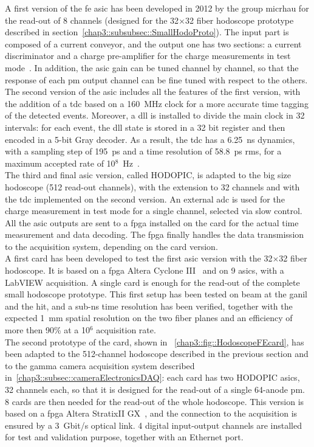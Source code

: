 A first version of the \gls{fe} \gls{asic} has been developed in 2012 by the group \gls{micrhau} for the read-out of 8 channels (designed for the 32$\times$32 fiber hodoscope prototype described in section~\ref{chap3::subsubsec::SmallHodoProto}). The input part is composed of a current conveyor, and the output one has two sections: a current discriminator and a charge pre-amplifier for the charge measurements in test mode~\parencite{Deng2012, Deng2013}. In addition, the \gls{asic} gain can be tuned channel by channel, so that the response of each \gls{pm} output channel can be fine tuned with respect to the others.\\
The second version of the \gls{asic} includes all the features of the first version, with the addition of a \gls{tdc} based on a 160~MHz clock for a more accurate time tagging of the detected events. Moreover, a \gls{dll} is installed to divide the main clock in 32 intervals: for each event, the \gls{dll} state is stored in a 32 bit register and then encoded in a 5-bit Gray decoder. As a result, the \gls{tdc} has a 6.25~ns dynamics, with a sampling step of 195~ps and a time resolution of 58.8~ps \gls{rms}, for a maximum accepted rate of 10$^{8}$~Hz~\parencite{Deng2012b}.\\
The third and final \gls{asic} version, called HODOPIC, is adapted to the big size hodoscope (512 read-out channels), with the extension to 32 channels and with the \gls{tdc} implemented on the second version. An external \gls{adc} is used for the charge measurement in test mode for a single channel, selected via slow control. All the \gls{asic} outputs are sent to a \gls{fpga} installed on the card for the actual time measurement and data decoding. The \gls{fpga} finally handles the data transmission to the acquisition system, depending on the card version.\\
A first card has been developed to test the first \gls{asic} version with the 32$\times$32 fiber hodoscope. It is based on a \gls{fpga} Altera Cyclone III~\parencite{Altera2012} and on 9 \glspl{asic}, with a LabVIEW acquisition. A single card is enough for the read-out of the complete small hodoscope prototype. This first setup has been tested on beam at the \gls{ganil} and the \gls{hit}, and a sub-ns time resolution has been verified, together with the expected 1~mm spatial resolution on the two fiber planes and an efficiency of more then 90\% at a 10$^{6}$ acquisition rate.\\
The second prototype of the card, shown in \figurename~\ref{chap3::fig::HodoscopeFEcard}, has been adapted to the 512-channel hodoscope described in the previous section and to the gamma camera acquisition system described in~\ref{chap3::subsec::cameraElectronicsDAQ}: each card has two HODOPIC \glspl{asic}, 32 channels each, so that it is designed for the read-out of a single 64-anode \gls{pm}. 8 cards are then needed for the read-out of the whole hodoscope. This version is based on a \gls{fpga} Altera StratixII GX~\parencite{Altera2009}, and the connection to the acquisition is ensured by a 3~Gbit/s optical link. 4 digital input-output channels are installed for test and validation purpose, together with an Ethernet port.\\
